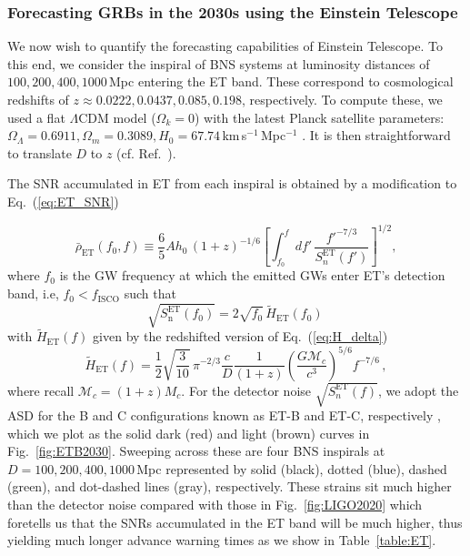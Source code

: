 \documentclass[prd,amsmath,amssymb,aps,floats,amsfonts,notitlepage,superscriptaddress,eqsecnum,nofootinbib,10pt]{revtex4-1}
\newcommand{\f}{\frac}
\newcommand{\be}{\begin{equation}}
\newcommand{\ee}{\end{equation}}
\begin{document}
\subsubsection{Forecasting GRBs in the 2030s using the Einstein Telescope}\label{Sec:ETB}
We now wish to quantify the forecasting capabilities of Einstein Telescope. To this end, we consider the inspiral of BNS systems
at luminosity distances of $100,200,400,1000\,$Mpc entering the ET band. 
These correspond to cosmological redshifts of $z\approx 0.0222,0.0437, 0.085, 0.198$, respectively.
To compute these, we used a flat $\Lambda$CDM model ($\Omega_k=0$) with the latest Planck satellite parameters: 
$\Omega_\Lambda = 0.6911, \Omega_m = 0.3089, H_0 = 67.74\,$km\,s$^{-1}\,$Mpc$^{-1}$ \cite{Planck2015}. %
It is then straightforward to translate $D$ to $z$ (cf. Ref.~\cite{Hogg:1999ad}).


The SNR accumulated in ET from each inspiral is obtained by a modification to Eq.~(\ref{eq:ET_SNR})

%
\be
\bar\rho_{\text{ET}}(f_0,f)\equiv \f{6}{5}A h_0\, (1+z)^{-1/6}\left[\int_{f_0}^{f} d f'\, \f{f'^{-7/3}}{S^\text{ET}_n(f')}\right]^{1/2} \label{eq:ET_SNRv2},
\ee
where $f_0$ is the GW frequency at which the emitted GWs enter ET's detection band, i.e, $f_0 < f_\text{ISCO}$ such that
%
 \be
 \sqrt{S^\text{ET}_\text{n}(f_0)} = 2\sqrt{f_0}\, \tilde{H}_\text{ET}(f_0) \label{eq:f0_ET}\,
 \ee
with $\tilde{H}_\text{ET}(f)$ given by the redshifted version of Eq.~(\ref{eq:H_delta})
%
\be
\tilde{H}_\text{ET}(f) = \f{1}{2}\sqrt{\f{3}{10}}\,\pi^{-2/3} \f{c}{D}\f{1}{(1+z)}\left(\f{G \mathcal{M}_c}{c^3}\right)^{5/6} f^{-7/6}\, , \label{eq:H_delta_redshifted}
\ee
%
where recall $\mathcal{M}_c = (1+z)M_c$.
For the detector noise $\sqrt{S^\text{ET}_n(f)}$, we adopt the ASD for the B and C configurations known as ET-B and ET-C, respectively \cite{Hild:2010id}, which we plot as the solid dark (red) and light (brown) curves in Fig.~\ref{fig:ETB2030}.
Sweeping across these are four BNS inspirals at $D=100,200,400,1000\,$Mpc represented by solid (black), dotted (blue), dashed (green),
and dot-dashed lines (gray), respectively. These strains sit much higher than the detector noise
compared with those in Fig.~\ref{fig:LIGO2020} which foretells us that the SNRs accumulated in the ET band will be much higher, 
thus yielding much longer advance warning times as we show in Table~\ref{table:ET}.
\end{document}
